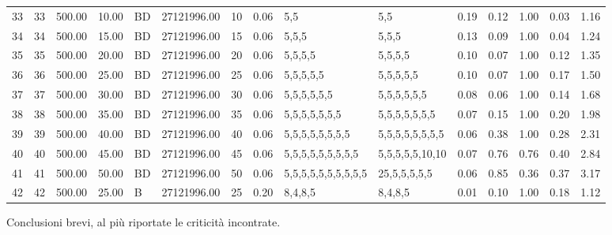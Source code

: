 \begin{table}[ht]
\begin{tabular}{rlrrlrlrllrrrrr}
  33 & 33 & 500.00 & 10.00 & BD & 27121996.00 & 10 & 0.06 & 5,5 & 5,5 & 0.19 & 0.12 & 1.00 & 0.03 & 1.16 \\ 
  34 & 34 & 500.00 & 15.00 & BD & 27121996.00 & 15 & 0.06 & 5,5,5 & 5,5,5 & 0.13 & 0.09 & 1.00 & 0.04 & 1.24 \\ 
  35 & 35 & 500.00 & 20.00 & BD & 27121996.00 & 20 & 0.06 & 5,5,5,5 & 5,5,5,5 & 0.10 & 0.07 & 1.00 & 0.12 & 1.35 \\ 
  36 & 36 & 500.00 & 25.00 & BD & 27121996.00 & 25 & 0.06 & 5,5,5,5,5 & 5,5,5,5,5 & 0.10 & 0.07 & 1.00 & 0.17 & 1.50 \\ 
  37 & 37 & 500.00 & 30.00 & BD & 27121996.00 & 30 & 0.06 & 5,5,5,5,5,5 & 5,5,5,5,5,5 & 0.08 & 0.06 & 1.00 & 0.14 & 1.68 \\ 
  38 & 38 & 500.00 & 35.00 & BD & 27121996.00 & 35 & 0.06 & 5,5,5,5,5,5,5 & 5,5,5,5,5,5,5 & 0.07 & 0.15 & 1.00 & 0.20 & 1.98 \\ 
  39 & 39 & 500.00 & 40.00 & BD & 27121996.00 & 40 & 0.06 & 5,5,5,5,5,5,5,5 & 5,5,5,5,5,5,5,5 & 0.06 & 0.38 & 1.00 & 0.28 & 2.31 \\ 
  40 & 40 & 500.00 & 45.00 & BD & 27121996.00 & 45 & 0.06 & 5,5,5,5,5,5,5,5,5 & 5,5,5,5,5,10,10 & 0.07 & 0.76 & 0.76 & 0.40 & 2.84 \\ 
  41 & 41 & 500.00 & 50.00 & BD & 27121996.00 & 50 & 0.06 & 5,5,5,5,5,5,5,5,5,5 & 25,5,5,5,5,5 & 0.06 & 0.85 & 0.36 & 0.37 & 3.17 \\ 
  42 & 42 & 500.00 & 25.00 & B & 27121996.00 & 25 & 0.20 & 8,4,8,5 & 8,4,8,5 & 0.01 & 0.10 & 1.00 & 0.18 & 1.12 \\ 
   \hline
\end{tabular}
\end{table}

Conclusioni brevi, al più riportate le criticità incontrate.